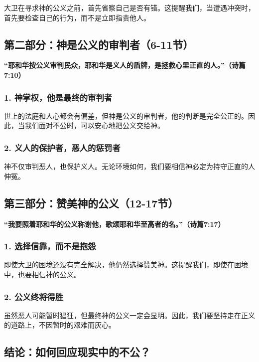 \documentclass[a4paper, 12pt]{article}
\begin{document}
大卫在寻求神的公义之前，首先省察自己是否有错。这提醒我们，当遭遇冲突时，首先要检查自己的行为，而不是立即指责他人。

\subsection*{第二部分：神是公义的审判者（6-11节）}

\textbf{“耶和华按公义审判民众，耶和华是义人的盾牌，是拯救心里正直的人。”（诗篇7:10）}

\subsubsection*{1. 神掌权，他是最终的审判者}

世上的法庭和人心都会有偏差，但神是公义的审判者，他的判断是完全公正的。因此，当我们面对不公时，可以安心地把公义交给神。

\subsubsection*{2. 义人的保护者，恶人的惩罚者}

神不仅审判恶人，也保护义人。无论环境如何，我们要相信神必定为持守正直的人伸冤。

\subsection*{第三部分：赞美神的公义（12-17节）}

\textbf{“我要照着耶和华的公义称谢他，歌颂耶和华至高者的名。”（诗篇7:17）}

\subsubsection*{1. 选择信靠，而不是抱怨}

即使大卫的困境还没有完全解决，他仍然选择赞美神。这提醒我们，即使在困境中，也要相信神的公义。

\subsubsection*{2. 公义终将得胜}

虽然恶人可能暂时猖狂，但最终神的公义一定会显明。因此，我们要坚持走在正义的道路上，不因暂时的艰难而灰心。

\subsection*{结论：如何回应现实中的不公？}
\end{document}
